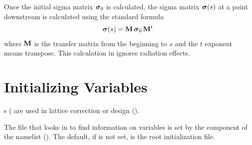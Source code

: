 {{{{{{{{{{{Once the initial sigma matrix ${\boldsymbol{\sigma}}_0$ is calculated, the sigma matrix ${\boldsymbol{\sigma}}(s)$ at a point
downstream is calculated using the standard formula
\begin{equation}
  {\boldsymbol{\sigma}}(s) = {\bf M} \, {\boldsymbol{\sigma}}_0 \, {\bf M}^t
\end{equation}
where ${\bf M}$ is the transfer matrix from the beginning to $s$ and the $t$ exponent means
transpose. This calculation in \tao ignores radiation effects.

\section{Initializing Variables}
\label{s:init.var} 

\tao {}s ( are used in lattice correction or design (). 

The file that \tao looks in to find information on \tao variables is set by the  component of
the  namelist (). The default, if  is not set, is
the root initialization file.

}}}}}}}}}}}
